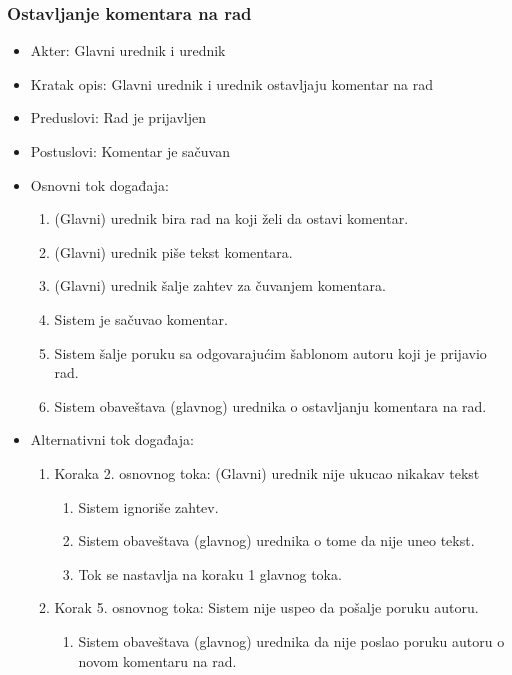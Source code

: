 \documentclass[a4paper]{article}
\begin{document}
\newpage

\subsubsection{Ostavljanje komentara na rad}
\label{subsubsection:ostavljanjekomentara}
\begin{itemize}
    \item Akter: Glavni urednik i urednik
    \item Kratak opis: Glavni urednik i urednik ostavljaju komentar na rad
    \item Preduslovi: Rad je prijavljen
    \item Postuslovi: Komentar je sačuvan
    \item Osnovni tok događaja:
        \begin{enumerate}
           \item (Glavni) urednik bira rad na koji želi da ostavi komentar.
           \item (Glavni) urednik piše tekst komentara.
           \item (Glavni) urednik šalje zahtev za čuvanjem komentara.
           \item Sistem je sačuvao komentar.
           \item Sistem šalje poruku sa odgovarajućim šablonom autoru koji je prijavio rad. 
           \item Sistem obaveštava (glavnog) urednika o ostavljanju komentara na rad.
        \end{enumerate}
    \item Alternativni tok događaja:
        \begin{enumerate}
            \item Koraka 2. osnovnog toka: (Glavni) urednik nije ukucao nikakav tekst
            \begin{enumerate}
                \item Sistem ignoriše zahtev.
                \item Sistem obaveštava (glavnog) urednika o tome da nije uneo tekst.
                \item Tok se nastavlja na koraku 1 glavnog toka.
            \end{enumerate}
            \item Korak 5. osnovnog toka: Sistem nije uspeo da pošalje poruku autoru.
            \begin{enumerate}
                \item Sistem obaveštava (glavnog) urednika da nije poslao poruku autoru o novom komentaru na rad.

\end{enumerate}
\end{enumerate}
\end{itemize}
\end{document}
